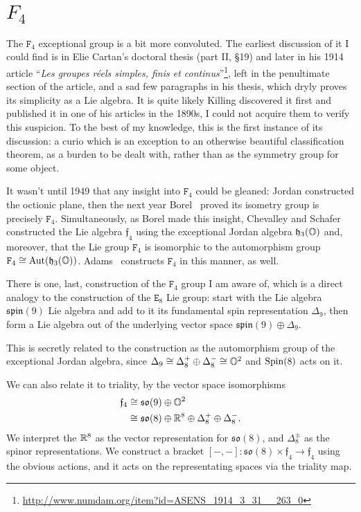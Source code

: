 \chapter{$F_{4}$}

The $\mathtt{F}_{4}$ exceptional group is a bit more convoluted. The
earliest discussion of it I could find is in Elie Cartan's doctoral
thesis (part II, \S19) and later in his 1914 article ``\textit{Les groupes r\'eels simples, finis et continus}''\footnote{\url{http://www.numdam.org/item?id=ASENS_1914_3_31__263_0}},
left in the penultimate section of the article, and a sad few paragraphs
in his thesis, which dryly proves its
simplicity as a Lie algebra. It is quite likely Killing discovered it
first and published it in one of his articles in the 1890s, I could not
acquire them to verify this suspicion. To the best of my knowledge, this
is the first instance of its discussion: a curio which is an exception to an
otherwise beautiful classification theorem, as a burden to be dealt
with, rather than as the symmetry group for some object.

It wasn't until 1949 that any insight into $\mathtt{F}_{4}$ could be
gleaned: Jordan constructed the octionic plane, then the next year Borel~\cite{Borel:1950}
proved its isometry group is precisely $\mathtt{F}_{4}$.
Simultaneously, as Borel made this insight, Chevalley and
Schafer~\cite{Chevalley:1950} constructed the Lie algebra
$\mathfrak{f}_{4}$ using the exceptional Jordan algebra
$\mathfrak{h}_{3}(\mathbb{O})$ and, moreover, that the Lie group
$\mathtt{F}_{4}$ is isomorphic to the automorphism group
$\mathtt{F}_{4}\cong\operatorname{Aut}(\mathfrak{h}_{3}(\mathbb{O}))$. Adams~\cite{adams1996:ex}
constructs $\mathtt{F}_{4}$ in this manner, as well.

\M
There is one, last, construction of the $\mathtt{F}_{4}$ group I am
aware of, which is a direct analogy to the construction of the
$\mathtt{E}_{8}$ Lie group: start with the Lie algebra $\mathfrak{spin}(9)$
Lie algebra and add to it its fundamental spin representation
$\Delta_{9}$, then form a Lie algebra out of the underlying vector space
$\mathfrak{spin}(9)\oplus\Delta_{9}$.

This is secretly related to the construction as the automorphism group
of the exceptional Jordan algebra, since
$\Delta_{9}\cong\Delta^{+}_{8}\oplus\Delta^{-}_{8}\cong\mathbb{O}^{2}$ and
$\operatorname{Spin}(8)$ acts on it.

We can also relate it to triality, by the vector space isomorphisms
\begin{subequations}
  \begin{align}
    \mathfrak{f}_{4} &\cong\mathfrak{so}(9)\oplus\mathbb{O}^{2}\\
    &\cong\mathfrak{so}(8)\oplus\mathbb{R}^{8}\oplus\Delta^{+}_{8}\oplus\Delta^{-}_{8}.
  \end{align}
\end{subequations}
We interpret the $\mathbb{R}^{8}$ as the vector representation for
$\mathfrak{so}(8)$, and $\Delta^{\pm}_{8}$ as the spinor
representations. We construct a bracket
$[-,-]\colon\mathfrak{so}(8)\times\mathfrak{f}_{4}\to\mathfrak{f}_{4}$
using the obvious actions, and it acts on the representating spaces via
the triality map.

